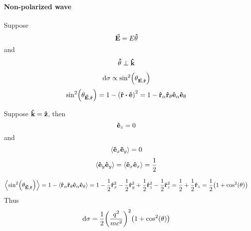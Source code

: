 \paragraph{Non-polarized wave}
Suppose
$$\va{E} = E\vu{\theta}$$
and $$\vu{\theta} \perp \vu{k}$$

$$\dd{\sigma} \propto \sin[2](\theta_{\va{E}, \vu{r}})$$
$$\sin[2](\theta_{\va{E}, \vu{r}}) = 1 -\qty(\vu{r} \vdot \vu{e})^2 = 1 - \vu{r}_\alpha \vu{r}_\theta \vu{e}_\alpha \vu{e}_\theta$$

Suppose 
$\vu{k} = \vu{z}$, then
$$\vu{e}_z = 0$$
and
$$\expval{\vu{e}_x \vu{e}_y} = 0$$
$$\expval{\vu{e}_y \vu{e}_y} =\expval{\vu{e}_x \vu{e}_x} = \frac{1}{2}$$

$$\expval{\sin[2](\theta_{\va{E}, \vu{r}})} = 1 - \expval{\vu{r}_\alpha \vu{r}_\theta \vu{e}_\alpha \vu{e}_\theta} = 1 - \frac{1}{2} \vu{r}_x^2- \frac{1}{2} \vu{r}_y^2+ \frac{1}{2} \vu{r}_z^2- \frac{1}{2} \vu{r}_z^2 = \frac{1}{2} + \frac{1}{2} \vu{r}_z = \frac{1}{2}\qty( 1+ \cos[2](\theta))$$
Thus
$$\dd{\sigma} = \frac{1}{2} \qty(\frac{q^2}{mc^2})^2 \qty(1+\cos[2](\theta))$$
